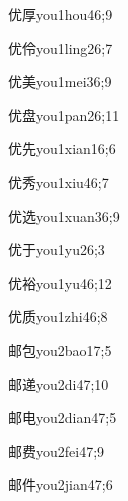 \begin{verbete}{优厚}{you1hou4}{6;9}
\end{verbete}
\begin{verbete}{优伶}{you1ling2}{6;7}
\end{verbete}
\begin{verbete}{优美}{you1mei3}{6;9}
\end{verbete}
\begin{verbete}{优盘}{you1pan2}{6;11}
\end{verbete}
\begin{verbete}{优先}{you1xian1}{6;6}
\end{verbete}
\begin{verbete}{优秀}{you1xiu4}{6;7}
\end{verbete}
\begin{verbete}{优选}{you1xuan3}{6;9}
\end{verbete}
\begin{verbete}{优于}{you1yu2}{6;3}
\end{verbete}
\begin{verbete}{优裕}{you1yu4}{6;12}
\end{verbete}
\begin{verbete}{优质}{you1zhi4}{6;8}
\end{verbete}
\begin{verbete}{邮包}{you2bao1}{7;5}
\end{verbete}
\begin{verbete}{邮递}{you2di4}{7;10}
\end{verbete}
\begin{verbete}{邮电}{you2dian4}{7;5}
\end{verbete}
\begin{verbete}{邮费}{you2fei4}{7;9}
\end{verbete}
\begin{verbete}{邮件}{you2jian4}{7;6}
\end{verbete}

